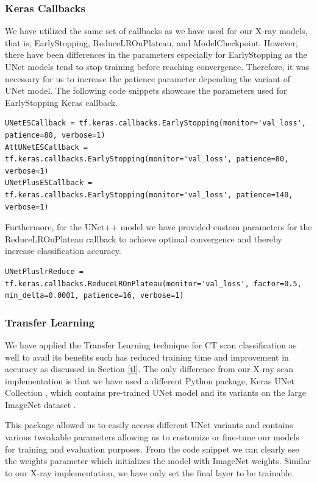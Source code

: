 \subsubsection{Keras Callbacks}

We have utilized the same set of callbacks as we have used for our X-ray models, that is, EarlyStopping, ReduceLROnPlateau, and ModelCheckpoint. However, there have been differences in the parameters especially for EarlyStopping as the UNet models tend to stop training before reaching convergence. Therefore, it was necessary for us to increase the patience parameter depending the variant of UNet model. The following code snippets showcase the parameters used for EarlyStopping Keras callback.

\vspace{1em}
\begin{lstlisting}
UNetESCallback = tf.keras.callbacks.EarlyStopping(monitor='val_loss', patience=80, verbose=1)
AttUNetESCallback = tf.keras.callbacks.EarlyStopping(monitor='val_loss', patience=80, verbose=1)
UNetPlusESCallback = tf.keras.callbacks.EarlyStopping(monitor='val_loss', patience=140, verbose=1)
\end{lstlisting}

Furthermore, for the UNet++ model we have provided custom parameters for the ReduceLROnPlateau callback to achieve optimal convergence and thereby increase classification accuracy.

\vspace{1em}
\begin{lstlisting}
UNetPluslrReduce = tf.keras.callbacks.ReduceLROnPlateau(monitor='val_loss', factor=0.5, min_delta=0.0001, patience=16, verbose=1)
\end{lstlisting}

\subsubsection{Transfer Learning}

We have applied the Transfer Learning technique for CT scan classification as well to avail its benefits such has reduced training time and improvement in accuracy as discussed in Section \ref{tl}. The only difference from our X-ray scan implementation is that we have used a different Python package, Keras UNet Collection \cite{KUC}, which contains pre-trained UNet model and its variants on the large ImageNet dataset \cite{IMG}. 

This package allowed us to easily access different UNet variants and contains various tweakable parameters allowing us to customize or fine-tune our models for training and evaluation purposes. From the code snippet we can clearly see the weights parameter which initializes the model with ImageNet weights. Similar to our X-ray implementation, we have only set the final layer to be trainable.

